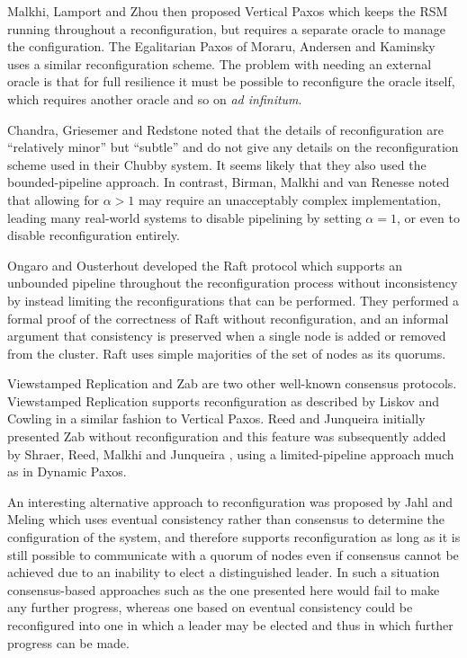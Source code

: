 \documentclass[journal]{IEEEtran}
\begin{document}
Malkhi, Lamport and Zhou \cite{vertical-paxos} then proposed Vertical Paxos
which keeps the RSM running throughout a reconfiguration, but requires a
separate oracle to manage the configuration. The Egalitarian Paxos of Moraru,
Andersen and Kaminsky \cite{egalitarian-paxos} uses a similar reconfiguration
scheme.  The problem with needing an external oracle is that for full
resilience it must be possible to reconfigure the oracle itself, which requires
another oracle and so on \textit{ad infinitum}.

Chandra, Griesemer and Redstone \cite{paxos-made-live} noted that the details
of reconfiguration are ``relatively minor'' but ``subtle'' and do not give any
details on the reconfiguration scheme used in their Chubby system. It seems
likely that they also used the bounded-pipeline approach. In contrast, Birman,
Malkhi and van Renesse \cite{virt-synch} noted that allowing for $\alpha > 1$
may require an unacceptably complex implementation, leading many real-world
systems to disable pipelining by setting $\alpha = 1$, or even to disable
reconfiguration entirely.

Ongaro and Ousterhout \cite{raft} developed the Raft protocol which supports an
unbounded pipeline throughout the reconfiguration process without inconsistency
by instead limiting the reconfigurations that can be performed. They performed
a formal proof of the correctness of Raft without reconfiguration, and an
informal argument that consistency is preserved when a single node is added or
removed from the cluster. Raft uses simple majorities of the set of nodes as
its quorums.

Viewstamped Replication and Zab are two other well-known consensus protocols.
Viewstamped Replication supports reconfiguration as described by Liskov and
Cowling \cite{viewstamped-replication} in a similar fashion to Vertical Paxos.
Reed and Junqueira \cite{zab} initially presented Zab without reconfiguration
and this feature was subsequently added by Shraer, Reed, Malkhi and Junqueira
\cite{zab-reconf}, using a limited-pipeline approach much as in Dynamic Paxos.

An interesting alternative approach to reconfiguration was proposed by Jahl and
Meling \cite{async-reconfig} which uses eventual consistency rather than
consensus to determine the configuration of the system, and therefore supports
reconfiguration as long as it is still possible to communicate with a quorum of
nodes even if consensus cannot be achieved due to an inability to elect a
distinguished leader. In such a situation consensus-based approaches such as
the one presented here would fail to make any further progress, whereas one
based on eventual consistency could be reconfigured into one in which a leader
may be elected and thus in which further progress can be made.
\end{document}

